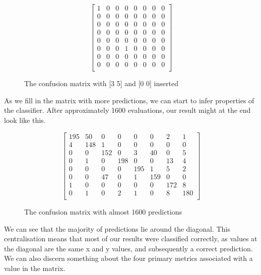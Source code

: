 \begin{figure}[h]
    \myfontsize
    \centering
    \[
    \begin{bmatrix}
     1 & 0 &  0 &  0 &  0 &  0 &  0 &  0\\
     0 & 0 &  0 &  0 &  0 &  0 &  0 &  0\\
     0 & 0 &  0 &  0 &  0 &  0 &  0 &  0\\
     0 & 0 &  0 &  0 &  0 &  0 &  0 &  0\\
     0 & 0 &  0 &  0 &  0 &  0 &  0 &  0\\
     0 & 0 &  0 &  1 &  0 &  0 &  0 &  0\\
     0 & 0 &  0 &  0 &  0 &  0 &  0 &  0\\
     0 & 0 &  0 &  0 &  0 &  0 &  0 &  0\\
    \end{bmatrix}
    \]
    \caption{The confusion matrix with [3 5] and [0 0] inserted }
    \label{mat:nonemptyCM}
\end{figure}

As we fill in the matrix with more predictions, we can start to infer properties of the classifier. After approximately 1600 evaluations, our result might at the end look like this.
\begin{figure}[h]
    \myfontsize
    \centering
    \[
    \begin{bmatrix}
     195 & 50 &  0 &  0 &  0 &  0 &  2  & 1\\
       4 & 148&  1 &  0 &  0 &  0 &  0  & 0\\
       0 &  0 & 152&  0 &  3 & 40 &  0  & 5\\
       0 &  1 &  0 &198 &  0 &  0 & 13  & 4\\
       0 &  0 &  0 & 0  &195 &  1 &  5  & 2\\
       0 &  0 & 47 & 0  &  1 &159 &  0  & 0\\
       1 &  0 &  0 & 0  &  0 &  0 & 172 &  8\\
       0 &  1 &  0 & 2  &  1 &  0 &  8  & 180\\
    \end{bmatrix}
    \]
    \caption{The confusion matrix with  almost 1600 predictions}
    \label{mat:FullCM}
\end{figure}
We can see that the majority of predictions lie around the diagonal. This centralisation means that most of our results were classified correctly, as values at the diagonal are the same x and y values, and subsequently a correct prediction. 
We can also discern something about the four primary metrics associated with a value in the matrix.\\

